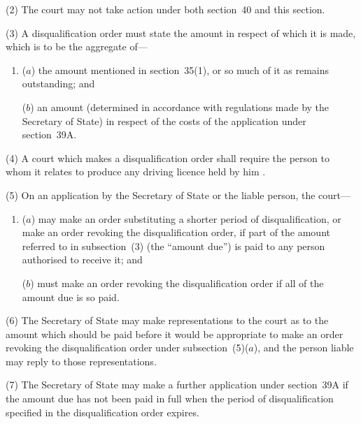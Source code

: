 \documentclass[12pt,a4paper]{article}
\begin{document}
(2) The court may not take action under both section~40 and this section.

(3) A disqualification order must state the amount in respect of which it is made, which is to be the aggregate of—
\begin{enumerate}\item[]
($a$) the amount mentioned in section~35(1), or so much of it as remains outstanding; and


($b$) an amount (determined in accordance with regulations made by the Secretary of State) in respect of the costs of the application under section~39A.
\end{enumerate}

(4) A court which makes a disqualification order shall require the person to whom it relates to produce any driving licence held by him%
.

(5) On an application by the 
Secretary of State  %
or the liable person, the court—
\begin{enumerate}\item[]
($a$) may make an order substituting a shorter period of disqualification, or make an order revoking the disqualification order, if part of the amount referred to in subsection~(3)  (the “amount due”) is paid to any person authorised to receive it; and

($b$) must make an order revoking the disqualification order if all of the amount due is so paid.
\end{enumerate}

(6) The 
Secretary of State  %
may make representations to the court as to the amount which should be paid before it would be appropriate to make an order revoking the disqualification order under subsection~(5)($a$), and the person liable may reply to those representations.

(7) The 
Secretary of State  %
may make a further application under section~39A if the amount due has not been paid in full when the period of disqualification specified in the disqualification order expires.
\end{document}
